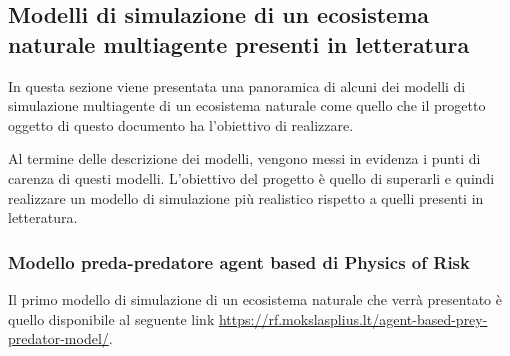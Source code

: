 \documentclass[11pt]{article}
\begin{document}
\subsection{Modelli di simulazione di un ecosistema naturale multiagente presenti in letteratura}
In questa sezione viene presentata una panoramica di alcuni dei modelli di simulazione multiagente di un ecosistema naturale come quello che il progetto oggetto di questo documento ha l'obiettivo di realizzare. 

Al termine delle descrizione dei modelli, vengono messi in evidenza i punti di carenza di questi modelli. L'obiettivo del progetto è quello di superarli e quindi realizzare un modello di simulazione più realistico rispetto a quelli presenti in letteratura.

\subsubsection{Modello preda-predatore agent based di Physics of Risk}
Il primo modello di simulazione di un ecosistema naturale che verrà presentato è quello disponibile al seguente link \url{https://rf.mokslasplius.lt/agent-based-prey-predator-model/}.
\end{document}
